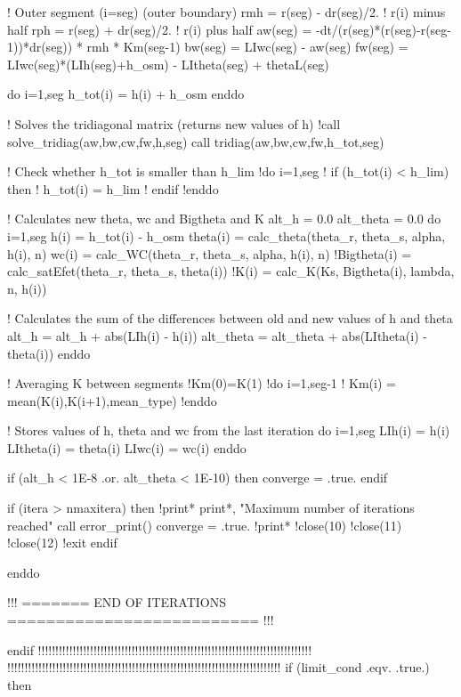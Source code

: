       ! Outer segment (i=seg) (outer boundary)
      rmh = r(seg) - dr(seg)/2.	! r(i) minus half
      rph = r(seg) + dr(seg)/2.	! r(i) plus half
      aw(seg) = -dt/(r(seg)*(r(seg)-r(seg-1))*dr(seg)) * rmh * Km(seg-1)
      bw(seg) = LIwc(seg) - aw(seg)
      fw(seg) = LIwc(seg)*(LIh(seg)+h_osm) - LItheta(seg) + thetaL(seg)

      do i=1,seg
        h_tot(i) = h(i) + h_osm
      enddo

    
      ! Solves the tridiagonal matrix (returns new values of h)
      !call solve_tridiag(aw,bw,cw,fw,h,seg)
      call tridiag(aw,bw,cw,fw,h_tot,seg)
    
      ! Check whether h_tot is smaller than h_lim
      !do i=1,seg
      !  if (h_tot(i) < h_lim) then
      !    h_tot(i) = h_lim
      !  endif
      !enddo

      ! Calculates new theta, wc and Bigtheta and K
      alt_h = 0.0
      alt_theta = 0.0
      do i=1,seg
        h(i) = h_tot(i) - h_osm
        theta(i) = calc_theta(theta_r, theta_s, alpha, h(i), n)
        wc(i) = calc_WC(theta_r, theta_s, alpha, h(i), n)
        !Bigtheta(i) = calc_satEfet(theta_r, theta_s, theta(i))
        !K(i) = calc_K(Ks, Bigtheta(i), lambda, n, h(i))
      
        ! Calculates the sum of the differences between old and new values of h and theta
        alt_h = alt_h + abs(LIh(i) - h(i))
        alt_theta = alt_theta + abs(LItheta(i) - theta(i))
      enddo
 
      ! Averaging K between segments
      !Km(0)=K(1)
      !do i=1,seg-1
      !  Km(i) = mean(K(i),K(i+1),mean_type)
      !enddo
    
      
      ! Stores values of h, theta and wc from the last iteration
      do i=1,seg
        LIh(i) = h(i)
        LItheta(i) = theta(i)
        LIwc(i) = wc(i)
      enddo
      
      if (alt_h < 1E-8 .or. alt_theta < 1E-10) then
        converge = .true.
      endif
    
      if (itera > nmaxitera) then
        !print*
        print*, "Maximum number of iterations reached"
	call error_print()
	converge = .true.
        !print*
        !close(10)
        !close(11)
        !close(12)
        !exit
      endif
    
    enddo


    !!! ======= END OF ITERATIONS ========================== !!!

  endif
!!!!!!!!!!!!!!!!!!!!!!!!!!!!!!!!!!!!!!!!!!!!!!!!!!!!!!!!!!!!!!!!!!!!!!!!!!!!!!!
!!!!!!!!!!!!!!!!!!!!!!!!!!!!!!!!!!!!!!!!!!!!!!!!!!!!!!!!!!!!!!!!!!!!!!!!!!!!!!!
  if (limit_cond .eqv. .true.) then

